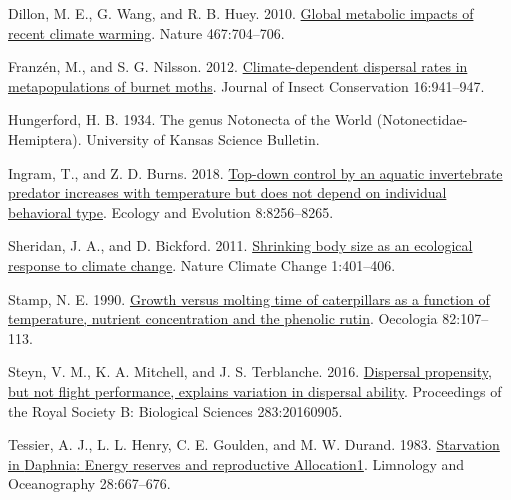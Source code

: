 \documentclass[
]{article}
\newlength{\cslhangindent}
\newenvironment{CSLReferences}[2] %
 {\begin{list}{}{%
  \setlength{\itemindent}{0pt}
  \setlength{\leftmargin}{0pt}
  \setlength{\parsep}{0pt}
  \ifodd #1
   \setlength{\leftmargin}{\cslhangindent}
   \setlength{\itemindent}{-1\cslhangindent}
  \fi
  \setlength{\itemsep}{#2\baselineskip}}}
 {\end{list}}
\begin{document}
\begin{CSLReferences}{1}{0}
Dillon, M. E., G. Wang, and R. B. Huey. 2010.
\href{https://doi.org/10.1038/nature09407}{Global metabolic impacts of
recent climate warming}. Nature 467:704--706.

Franzén, M., and S. G. Nilsson. 2012.
\href{https://doi.org/10.1007/s10841-012-9481-4}{Climate-dependent
dispersal rates in metapopulations of burnet moths}. Journal of Insect
Conservation 16:941--947.

Hungerford, H. B. 1934. The genus {Notonecta} of the {World}
({Notonectidae-Hemiptera}). University of Kansas Science Bulletin.

Ingram, T., and Z. D. Burns. 2018.
\href{https://doi.org/10.1002/ece3.4367}{Top-down control by an aquatic
invertebrate predator increases with temperature but does not depend on
individual behavioral type}. Ecology and Evolution 8:8256--8265.

Sheridan, J. A., and D. Bickford. 2011.
\href{https://doi.org/10.1038/nclimate1259}{Shrinking body size as an
ecological response to climate change}. Nature Climate Change
1:401--406.

Stamp, N. E. 1990. \href{https://doi.org/10.1007/BF00318541}{Growth
versus molting time of caterpillars as a function of temperature,
nutrient concentration and the phenolic rutin}. Oecologia 82:107--113.

Steyn, V. M., K. A. Mitchell, and J. S. Terblanche. 2016.
\href{https://doi.org/10.1098/rspb.2016.0905}{Dispersal propensity, but
not flight performance, explains variation in dispersal ability}.
Proceedings of the Royal Society B: Biological Sciences 283:20160905.

Tessier, A. J., L. L. Henry, C. E. Goulden, and M. W. Durand. 1983.
\href{https://doi.org/10.4319/lo.1983.28.4.0667}{Starvation in
{Daphnia}: {Energy} reserves and reproductive Allocation1}. Limnology
and Oceanography 28:667--676.

\end{CSLReferences}
\end{document}
